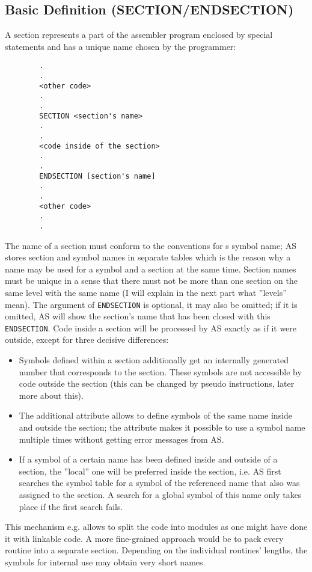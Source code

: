 \documentclass[12pt,twoside]{report}
\makeatletter
\newcommand{\tty}[1]{{\tt #1}}
\newcommand{\ttindex}[1]{\index{#1@{\tt #1}}}
\newcommand{\asname}{{AS}}
\makeatother
\begin{document}

\subsection{Basic Definition (SECTION/ENDSECTION)}
\ttindex{SECTION}\ttindex{ENDSECTION}

A section represents a part of the assembler program enclosed by
special statements and has a unique name chosen by the programmer:
\begin{verbatim}
        .
        .
        <other code>
        .
        .
        SECTION <section's name>
        .
        .
        <code inside of the section>
        .
        .
        ENDSECTION [section's name]
        .
        .
        <other code>
        .
        .
\end{verbatim}
The name of a section must conform to the conventions for s symbol
name; \asname{} stores section and symbol names in separate tables which is
the reason why a name may be used for a symbol and a section at the
same time.  Section names must be unique in a sense that there must
not be more than one section on the same level with the same name (I
will explain in the next part what ''levels'' mean).  The argument of
\tty{ENDSECTION} is optional, it may also be omitted; if it is omitted, \asname{}
will show the section's name that has been closed with this
\tty{ENDSECTION}.  Code inside a section will be processed by \asname{} exactly
as if it were outside, except for three decisive differences:
\begin{itemize}
\item{Symbols defined within a section additionally get an internally
      generated number that corresponds to the section.  These symbols
      are not accessible by code outside the section (this can be
      changed by pseudo instructions, later more about this).}
\item{The additional attribute allows to define symbols of the same
      name inside and outside the section; the attribute makes it
      possible to use a symbol name multiple times without getting error
      messages from \asname{}.}
\item{If a symbol of a certain name has been defined inside and outside
      of a section, the ''local'' one will be preferred inside the
      section, i.e. \asname{} first searches the symbol table for a symbol of
      the referenced name that also was assigned to the section.  A
      search for a global symbol of this name only takes place if the
      first search fails.}
\end{itemize}
This mechanism e.g. allows to split the code into modules as one
might have done it with linkable code.  A more fine-grained approach
would be to pack every routine into a separate section.  Depending on
the individual routines' lengths, the symbols for internal use may
obtain very short names.
\end{document}
